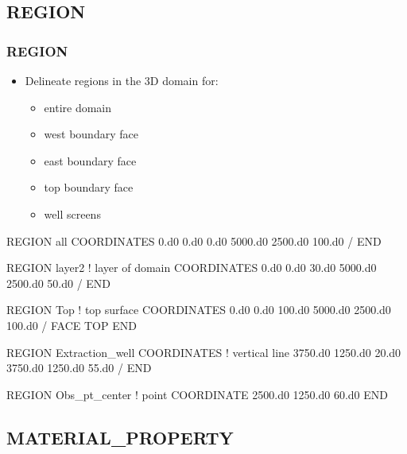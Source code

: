 \documentclass{beamer}
\newcommand\bluecomment[1]{{{\color{blue} #1}}}
\newcommand\magentacomment[1]{{{\color{magenta} #1}}}
\begin{document}
\subsection{REGION}

\begin{frame}\frametitle{REGION}

\begin{itemize}
  \item Delineate regions in the 3D domain for:
  \begin{itemize}
    \item entire domain
    \item west boundary face
    \item east boundary face
    \item top boundary face
    \item well screens
  \end{itemize}
\end{itemize}

\begin{semiverbatim}
REGION all
  COORDINATES
    0.d0    0.d0    0.d0
    5000.d0 2500.d0 100.d0
  /
END

\newpage
REGION layer2        \bluecomment{! layer of domain}
  COORDINATES
    0.d0    0.d0    30.d0
    5000.d0 2500.d0 50.d0
  /
END

REGION Top           \bluecomment{! top surface}
  COORDINATES
    0.d0    0.d0    100.d0
    5000.d0 2500.d0 100.d0
  /
  FACE TOP
END

\newpage
REGION Extraction_well
  COORDINATES             \bluecomment{! vertical line}
    3750.d0 1250.d0 20.d0
    3750.d0 1250.d0 55.d0
  /
END

REGION Obs_pt_center      \bluecomment{! point}
  \magentacomment{COORDINATE} 2500.d0 1250.d0 60.d0
END

\end{semiverbatim}

\end{frame}


\subsection{MATERIAL\_PROPERTY}
\end{document}
